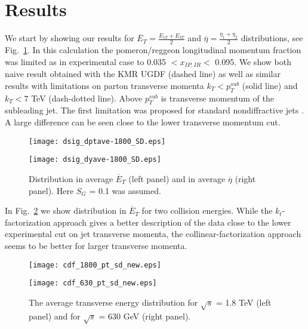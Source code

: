 \documentclass[12pt]{article}
\begin{document}
\section{Results}
We start by showing our results for ${\overline E}_T = \frac{E_{1T} + E_{2T}}{2}$
and ${\overline \eta} = \frac{\eta_1 + \eta_2}{2}$ distributions, see Fig.~\ref{fig:dsig-1800_SD}.
In this calculation the pomeron/reggeon longitudinal momentum 
fraction was limited as in experimental case \cite{Affolder:2000vb,Affolder:2001zn} 
to 0.035 $< x_{I\!P,I\!R} <$ 0.095.
We show both naive result obtained with the KMR UGDF (dashed line)
as well as similar results with limitations on parton transverse
momenta $k_T < p_T^{sub}$ (solid line) and $k_T < 7 $ TeV (dash-dotted line). Above $p_T^{sub}$ is transverse momentum of the subleading jet.
The first limitation was proposed for standard nondiffractive jets
\cite{Nefedov:2013ywa}. 
A large difference can be seen close to the lower transverse momentum
cut.
\begin{figure}[!htbp]
\begin{minipage}{0.47\textwidth}
 \centerline{\texttt{[image: dsig\_dptave-1800\_SD.eps]}}
\end{minipage}
\hspace{0.5cm}
\begin{minipage}{0.47\textwidth}
 \centerline{\texttt{[image: dsig\_dyave-1800\_SD.eps]}}
\end{minipage}
   \caption{
\small Distribution in average ${\overline E}_T$ (left panel) and
in average ${\overline \eta}$ (right panel). Here $S_G$ = 0.1 was assumed.
}
 \label{fig:dsig-1800_SD}
\end{figure}
In Fig.~\ref{fig:cdf_pt} we show distribution in ${\overline E}_T$ for two collision
energies. While the $k_t$-factorization approach gives a better
description of the data close to the lower experimental cut on
jet transverse momenta, the collinear-factorization approach seems to
be better for larger transverse momenta.
\begin{figure}[!htbp]
\begin{minipage}{0.47\textwidth}
 \centerline{\texttt{[image: cdf\_1800\_pt\_sd\_new.eps]}}
\end{minipage}
\hspace{0.5cm}
\begin{minipage}{0.47\textwidth}
 \centerline{\texttt{[image: cdf\_630\_pt\_sd\_new.eps]}}
\end{minipage}
   \caption{
\small The average transverse energy distribution for $\sqrt{s}$ = 1.8 TeV
(left panel) and for $\sqrt{s}$ = 630 GeV (right panel).
}
 \label{fig:cdf_pt}
\end{figure}
\end{document}
